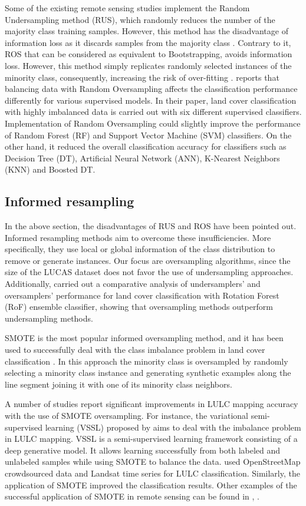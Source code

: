 \documentclass[remotesensing,article,submit,moreauthors,pdftex]{Definitions/mdpi}
\begin{document}
Some of the existing remote sensing studies implement the Random %
Undersampling method (RUS), which randomly reduces the number of the majority
class training samples. However, this method has the disadvantage of information
loss as it discards samples from the majority class \cite{Feng2019}. Contrary to
it, ROS that can be considered as equivalent to Bootstrapping,
avoids information loss. However, this method simply replicates randomly
selected instances of the minority class, consequently, increasing the risk of
over-fitting \cite{Krawczyk2016}. \cite{Maxwell2018} reports that balancing data
with Random Oversampling affects the classification performance differently for
various supervised models. In their paper, land cover classification with highly
imbalanced data is carried out with six different supervised classifiers.
Implementation of Random Oversampling could slightly improve the performance of
Random Forest (RF) and Support Vector Machine (SVM) classifiers. On the other
hand, it reduced the overall classification accuracy for classifiers such as
Decision Tree (DT), Artificial Neural Network (ANN), K-Nearest Neighbors (KNN)
and Boosted DT.

\subsection{Informed resampling}

In the above section, the disadvantages of RUS and ROS have been pointed out.
Informed resampling methods aim to overcome these insufficiencies. More
specifically, they use local or global information of the class distribution to
remove or generate instances. Our focus are oversampling algorithms, since the
size of the LUCAS dataset does not favor the use of undersampling approaches.
Additionally, \cite{Feng2018} carried out a comparative analysis of
undersamplers' and oversamplers' performance for land cover classification with
Rotation Forest (RoF) ensemble classifier, showing that oversampling methods
outperform undersampling methods.

SMOTE is the most popular informed oversampling method, and it has been used to
successfully deal with the class imbalance problem in land cover classification
\cite{Cenggoro2018}. In this approach the minority class is oversampled by
randomly selecting a minority class instance and generating synthetic examples
along the line segment joining it with one of its minority class neighbors.

A number of studies report significant improvements in LULC mapping accuracy
with the use of SMOTE oversampling. For instance, the variational
semi-supervised learning (VSSL) proposed by \cite{Cenggoro2018} aims to deal
with the imbalance problem in LULC mapping. VSSL is a semi-supervised learning
framework consisting of a deep generative model. It allows learning successfully
from both labeled and unlabeled samples while using SMOTE to balance the data.
\cite{Johnson2016} used OpenStreetMap crowdsourced data and Landsat time series
for LULC classification. Similarly, the application of SMOTE improved the
classification results. Other examples of the successful application of SMOTE in
remote sensing can be found in \cite{Bogner2018}, \cite{Panda2018}.
\end{document}
